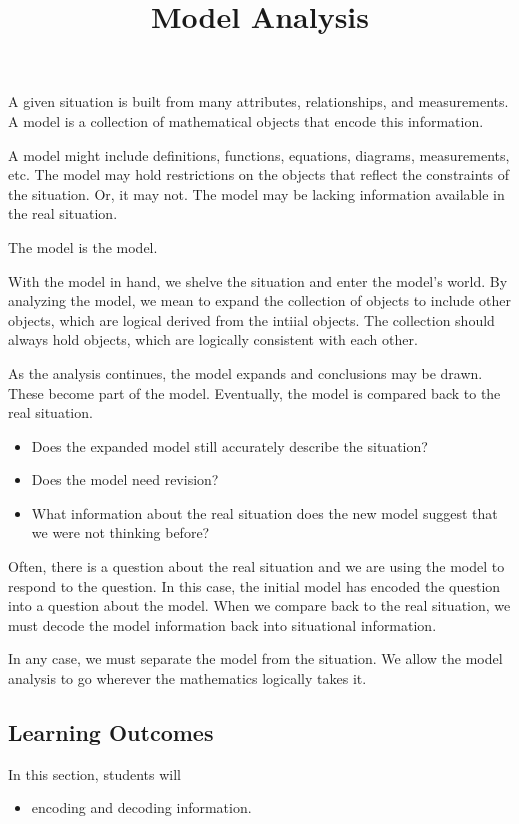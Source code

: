 \documentclass{ximera}
\title{Model Analysis}
\begin{document}
\begin{abstract}
\end{abstract}
\maketitle






A given situation is built from many attributes, relationships, and measurements. A model is a collection of mathematical objects that encode this information.

A model might include definitions, functions, equations, diagrams, measurements, etc. The model may hold restrictions on the objects that reflect the constraints of the situation.  Or, it may not. The model may be lacking information available in the real situation.

The model is the model.

With the model in hand, we shelve the situation and enter the model's world. By analyzing the model, we mean to expand the collection of objects to include other objects, which are logical derived from the intiial objects.  The collection should always hold objects, which are logically consistent with each other.

As the analysis continues, the model expands and conclusions may be drawn.  These become part of the model. Eventually, the model is compared back to the real situation.  



\begin{itemize}
\item Does the expanded model still accurately describe the situation?
\item Does the model need revision?
\item What information about the real situation does the new model suggest that we were not thinking before?
\end{itemize}


Often, there is a question about the real situation and we are using the model to respond to the question.  In this case, the initial model has encoded the question into a question about the model.  When we compare back to the real situation, we must decode the model information back into situational information.


In any case, we must separate the model from the situation.  We allow the model analysis to go wherever the mathematics logically takes it.







\subsection{Learning Outcomes}


\begin{sectionOutcomes}
In this section, students will 

\begin{itemize}
\item encoding and decoding information.
\end{itemize}
\end{sectionOutcomes}
\end{document}
